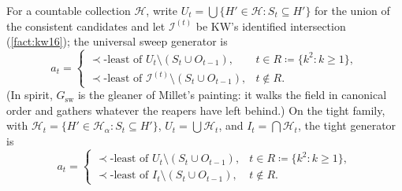 \documentclass[11pt]{article}
\numberwithin{equation}{section}
\newcommand{\mc}[1]{\mathcal{#1}}
\newcommand{\defeq}{\coloneqq}
\newcommand{\Hcal}{\mc{H}}
\newcommand{\Hfam}{\Hcal_{\alpha}}
\newcommand{\Seen}{S}
\newcommand{\Out}{O}
\theoremstyle{plain}
\theoremstyle{definition}
\theoremstyle{remark}
\begin{document}
For a countable collection $\Hcal$, write $U_t = \bigcup \{ H' \in \Hcal : \Seen_t \subseteq
H'\}$ for the union of the consistent candidates and let $\mathcal I^{(t)}$ be KW's identified
intersection (\cref{fact:kw16}); the universal sweep generator is
\begin{equation}\label{eq:gharv}
  a_t = \begin{cases}
    \prec\text{-least of } U_t \setminus (\Seen_t \cup \Out_{t-1}),
      & t \in R \defeq \{ k^2 : k \ge 1\},\\[2pt]
    \prec\text{-least of } \mathcal I^{(t)} \setminus (\Seen_t \cup \Out_{t-1}),
      & t \notin R.
  \end{cases}
\end{equation}
(In spirit, $G_{\mathrm{sw}}$ is the gleaner of Millet's painting: it walks the field
in canonical order and gathers whatever the reapers have left behind.) On the tight family,
with $\Hcal_t = \{ H' \in \Hfam : \Seen_t \subseteq H'\}$, $U_t = \bigcup
\Hcal_t$, and $I_t = \bigcap \Hcal_t$, the tight generator is
\begin{equation}\label{eq:gstar}
  a_t = \begin{cases}
    \prec\text{-least of } U_t \setminus (\Seen_t \cup \Out_{t-1}),
      & t \in R \defeq \{k^2 : k \ge 1\}, \\[2pt]
    \prec\text{-least of } I_t \setminus (\Seen_t \cup \Out_{t-1}),
      & t \notin R.
  \end{cases}
\end{equation}
\end{document}
